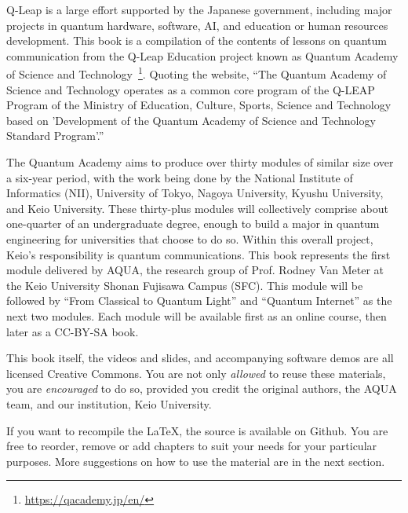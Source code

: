 
\begin{preface}
Q-Leap is a large effort supported by the Japanese government, including major projects in quantum hardware, software, AI, and education or human resources development.  This book is a compilation of the contents of lessons on quantum communication from the Q-Leap Education project known as Quantum Academy of Science and Technology~\footnote{\url{https://qacademy.jp/en/}}. Quoting the website, ``The Quantum Academy of Science and Technology operates as a common core program of the Q-LEAP Program of the Ministry of Education, Culture, Sports, Science and Technology based on 'Development of the Quantum Academy of Science and Technology Standard Program'.''

The Quantum Academy aims to produce over thirty modules of similar size over a six-year period, with the work being done by the National Institute of Informatics (NII), University of Tokyo, Nagoya University, Kyushu University, and Keio University.  These thirty-plus modules will collectively comprise about one-quarter of an undergraduate degree, enough to build a major in quantum engineering for universities that choose to do so. Within this overall project, Keio's responsibility is quantum communications.  This book represents the first module delivered by AQUA, the research group of Prof. Rodney Van Meter at the Keio University Shonan Fujisawa Campus (SFC).  This module will be followed by ``From Classical to Quantum Light'' and ``Quantum Internet'' as the next two modules.  Each module will be available first as an online course, then later as a CC-BY-SA book.

This book itself, the videos and slides, and accompanying software demos are all licensed Creative Commons. You are not only \emph{allowed} to reuse these materials, you are \emph{encouraged} to do so, provided you credit the original authors, the AQUA team, and our institution, Keio University.

If you want to recompile the \LaTeX, the source is available on Github. You are free to reorder, remove or add chapters to suit your needs for your particular purposes.  More suggestions on how to use the material are in the next section.

\author{Michal and Rodney}
\date{sometime in 2023}
\end{preface}


